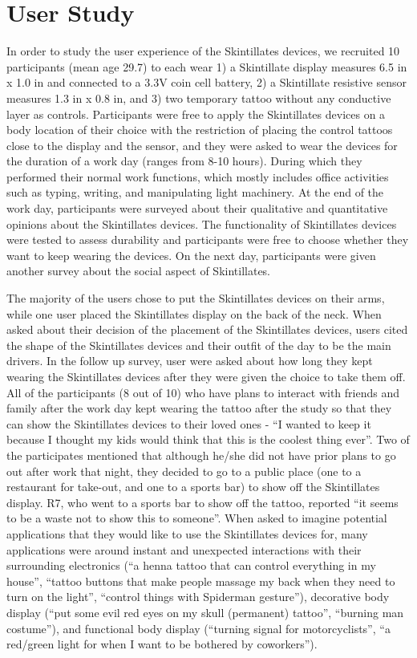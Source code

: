 \documentclass{sigchi}
\begin{document}
\section {User Study}
In order to study the user experience of the Skintillates devices, we recruited 10 participants (mean age 29.7) to each wear 1) a Skintillate display measures 6.5 in x 1.0 in and connected to a 3.3V coin cell battery, 2) a Skintillate resistive sensor measures 1.3 in x 0.8 in, and 3) two temporary tattoo without any conductive layer as controls. Participants were free to apply the Skintillates devices on a body location of their choice with the restriction of placing the control tattoos close to the display and the sensor,  and they were asked to wear the devices for the duration of a work day (ranges from 8-10 hours). During which they performed their normal work functions, which mostly includes office activities such as typing, writing, and manipulating light machinery. At the end of the work day, participants were surveyed about their qualitative and quantitative opinions about the Skintillates devices. The functionality of Skintillates devices were tested to assess durability and participants were free to choose whether they want to keep wearing the devices. On the next day, participants were given another survey about the social aspect of Skintillates.


The majority of the users chose to put the Skintillates devices on their arms, while one user placed the Skintillates display on the back of the neck. When asked about their decision of the placement of the Skintillates devices, users cited the shape of the Skintillates devices and their outfit of the day to be the main drivers. In the follow up survey, user were asked about how long they kept wearing the Skintillates devices after they were given the choice to take them off. All of the participants (8 out of 10) who have plans to interact with friends and family after the work day kept wearing the tattoo after the study so that they can show the Skintillates devices to their loved ones - ``I wanted to keep it because I thought my kids would think that this is the coolest thing ever''. Two of the participates mentioned that although he/she did not have prior plans to go out after work that night, they decided to go to a public place (one to a restaurant for take-out, and one to a sports bar) to show off the Skintillates display. R7, who went to a sports bar to show off the tattoo, reported ``it seems to be a waste not to show this to someone''. When asked to imagine potential applications that they would like to use the Skintillates devices for, many applications were around instant and unexpected interactions with their surrounding electronics (``a henna tattoo that can control everything in my house'', ``tattoo buttons that make people massage my back when they need to turn on the light'', ``control things with Spiderman gesture''), decorative body display (``put some evil red eyes on my skull (permanent) tattoo'', ``burning man costume''), and functional body display (``turning signal for motorcyclists'', ``a red/green light for when I want to be bothered by coworkers''). 
\end{document}
